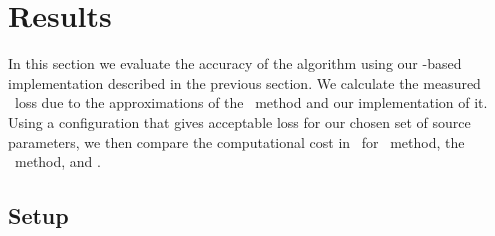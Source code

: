 \section{Results}
\label{sec:results}

In this section we evaluate the accuracy of the \lloid{} algorithm using our 
\gstreamer{}-based implementation described in the previous section. We calculate the
measured \SNR\ loss due to the approximations of the \lloid\ method and our
implementation of it. Using a configuration that gives acceptable \SNR{} loss for
our chosen set of source parameters, we then compare the computational cost in \flops\
for \TD\ method, the \FD\ method, and \lloid.

\subsection{Setup}


